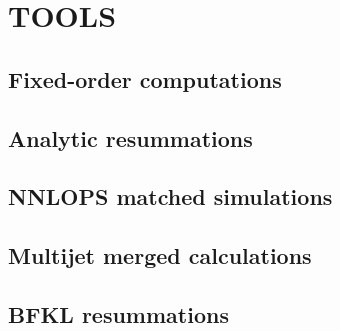 \section{TOOLS}
\label{sec:hjetscomp:tools}

\subsection{Fixed-order computations}
\label{sec:hjetscomp:tools:fo}




\subsection{Analytic resummations}
\label{sec:hjetscomp:tools:ares}



\subsection{NNLOPS matched simulations}
\label{sec:hjetscomp:tools:nnlops}



\subsection{Multijet merged calculations}
\label{sec:hjetscomp:tools:mc}




\subsection{BFKL resummations}
\label{sec:hjetscomp:tools:bfkl}


